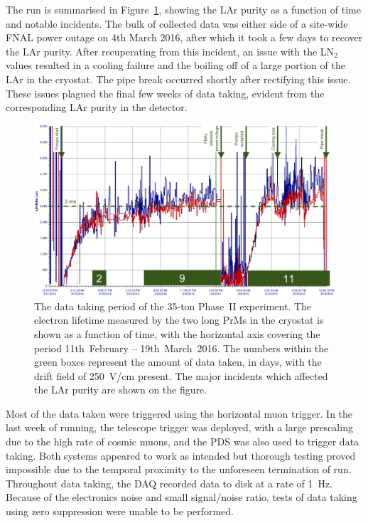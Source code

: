 The run is summarised in Figure~\ref{fig:35tonPhaseIIData}, showing the LAr purity as a function of time and notable incidents.  The bulk of collected data was either side of a site-wide FNAL power outage on 4th March 2016, after which it took a few days to recover the LAr purity.  After recuperating from this incident, an issue with the LN$_2$ values resulted in a cooling failure and the boiling off of a large portion of the LAr in the cryostat.  The pipe break occurred shortly after rectifying this issue.  These issues plagued the final few weeks of data taking, evident from the corresponding LAr purity in the detector.%

\begin{figure}
  \centering
  \includegraphics[width=14cm]{35tonPhaseIIDataEdit.png}
  \caption[The data taking period of the 35-ton Phase~II experiment.]{The data taking period of the 35-ton Phase~II experiment.  The electron lifetime measured by the two long PrMs in the cryostat is shown as a function of time, with the horizontal axis covering the period 11th~February -- 19th~March~2016.  The numbers within the green boxes represent the amount of data taken, in days, with the drift field of 250~V/cm present.  The major incidents which affected the LAr purity are shown on the figure.}
  \label{fig:35tonPhaseIIData}
\end{figure}

Most of the data taken were triggered using the horizontal muon trigger.  In the last week of running, the telescope trigger was deployed, with a large prescaling due to the high rate of cosmic muons, and the PDS was also used to trigger data taking.  Both systems appeared to work as intended but thorough testing proved impossible due to the temporal proximity to the unforeseen termination of run.  Throughout data taking, the DAQ recorded data to disk at a rate of 1~Hz.  Because of the electronics noise and small signal/noise ratio, tests of data taking using zero suppression were unable to be performed.

